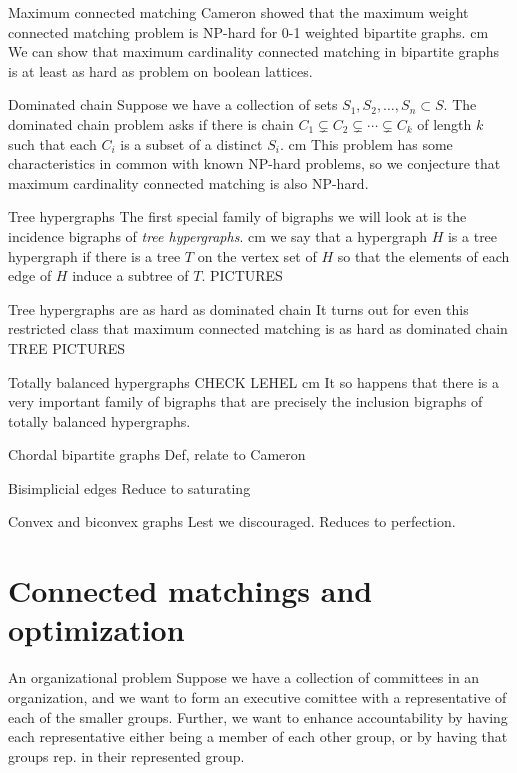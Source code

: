 \documentclass{beamer}
\newcommand{\bframe}[2]{\begin{frame}{#1} #2 \end{frame}}
\begin{document}
\bframe{Maximum connected matching}{
 	Cameron showed that the maximum weight connected matching problem is NP-hard for 0-1 weighted bipartite graphs. \pause\vskip 0.5 cm
	We can show that maximum cardinality connected matching in bipartite graphs is at least as hard as problem on boolean lattices.
}

\bframe{Dominated chain}{
	Suppose we have a collection of sets $S_1, S_2, \ldots, S_n \subset S$.  The dominated chain problem asks if there is chain $C_1 \subsetneq C_2 \subsetneq \cdots \subsetneq C_k$ of length $k$ such that each $C_i$ is a subset of a distinct $S_i$.
\pause \vskip 0.5 cm 
	This problem has some characteristics in common with known NP-hard problems, so we conjecture that maximum cardinality connected matching is also NP-hard.
}

\bframe{Tree hypergraphs}{
 	The first special family of bigraphs we will look at is the incidence bigraphs of {\it tree hypergraphs}. \pause\vskip 0.5 cm
 	we say that a hypergraph $H$ is a tree hypergraph if there is a tree $T$ on the vertex set of $H$ so that the elements of each edge of $H$ induce a subtree of $T$.  PICTURES
}

\bframe{Tree hypergraphs are as hard as dominated chain}{
	It turns out for even this restricted class that maximum connected matching is as hard as dominated chain TREE PICTURES
}

\bframe{Totally balanced hypergraphs}{ 
 	CHECK LEHEL\pause\vskip 0.5 cm
	It so happens that there is a very important family of bigraphs that are precisely the inclusion bigraphs of totally balanced hypergraphs.
}

\bframe{Chordal bipartite graphs}{Def, relate to Cameron
}

\bframe{Bisimplicial edges}{
Reduce to saturating
}

\bframe{Convex and biconvex graphs}{
 	Lest we discouraged.  Reduces to perfection.
}

\section{Connected matchings and optimization}
\bframe{An organizational problem}{Suppose we have a collection of committees in an organization, and we want to form an executive comittee with a representative of each of the smaller groups.  Further, we want to enhance accountability by having each representative either being a member of each other group, or by having that groups rep. in their represented group.}
\end{document}
